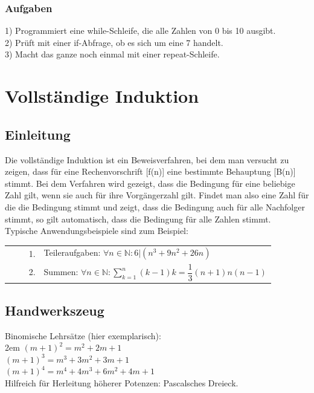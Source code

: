 \documentclass[11pt,final]{scrreprt}
\newcommand{\br} {\medskip\\}
\newcommand{\N} {\mathbb N}
\begin{document}
\subsection{Aufgaben}
1) Programmiert eine while-Schleife, die alle Zahlen von 0 bis 10 ausgibt.\\
2) Prüft mit einer if-Abfrage, ob es sich um eine 7 handelt.\\
3) Macht das ganze noch einmal mit einer repeat-Schleife.\\

\chapter{Vollständige Induktion}

\section{Einleitung}
Die vollständige Induktion ist ein Beweisverfahren, bei dem man versucht zu zeigen, dass für eine Rechenvorschrift [f(n)] eine bestimmte Behauptung [B(n)] stimmt. Bei dem Verfahren wird gezeigt, dass die Bedingung für eine beliebige Zahl gilt, wenn sie auch für ihre Vorgängerzahl gilt. Findet man also eine Zahl für die die Bedingung stimmt und zeigt, dass die Bedingung auch für alle Nachfolger stimmt, so gilt automatisch, dass die Bedingung für alle Zahlen stimmt. \br
Typische Anwendungsbeispiele sind zum Beispiel:\br
		
\begin{tabular}{c l}		 
~~~~ 1. & Teileraufgaben: $ \forall n \in \N: 6 | (n^3 + 9n^2 + 26n) $ \\		  
~~~~ 2. & Summen: $ \forall n \in \N: \sum\limits_{k=1}^n (k-1)k = \dfrac{1}{3} (n+1)n(n-1) $ \\ 		
\end{tabular} 

\section{Handwerkszeug}

Binomische Lehrsätze (hier exemplarisch):\\

\begingroup
\leftskip2em 
$ (m+1)^2 = m^2+2m+1 $\\
$ (m+1)^3 = m^3+3m^2+3m+1 $\\
$ (m+1)^4 = m^4+4m^3+6m^2+4m+1 $\\
Hilfreich für Herleitung höherer Potenzen: Pascalsches Dreieck.\\
\par	
\endgroup 
\end{document}
